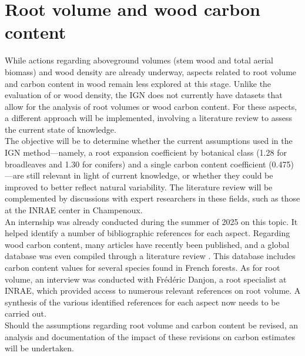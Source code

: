 \chapter{Root volume and wood carbon content \label{chap::cc}}

While actions regarding aboveground volumes (stem wood and total aerial biomass) and wood density are already underway, aspects related to root volume and carbon content in wood remain less explored at this stage. Unlike the evaluation of or wood density, the IGN does not currently have datasets that allow for the analysis of root volumes or wood carbon content. For these aspects, a different approach will be implemented, involving a literature review to assess the current state of knowledge. \\

The objective will be to determine whether the current assumptions used in the IGN method---namely, a root expansion coefficient by botanical class (1.28 for broadleaves and 1.30 for conifers) and a single carbon content coefficient (0.475)---are still relevant in light of current knowledge, or whether they could be improved to better reflect natural variability. The literature review will be complemented by discussions with expert researchers in these fields, such as those at the INRAE center in Champenoux. \\

An internship was already conducted during the summer of 2025 on this topic. It helped identify a number of bibliographic references for each aspect. Regarding wood carbon content, many articles have recently been published, and a global database was even compiled through a literature review \parencite{Doraisami2022}. This database includes carbon content values for several species found in French forests. As for root volume, an interview was conducted with Frédéric Danjon, a root specialist at INRAE, which provided access to numerous relevant references on root volume. A synthesis of the various identified references for each aspect now needs to be carried out. \\

Should the assumptions regarding root volume and carbon content be revised, an analysis and documentation of the impact of these revisions on carbon estimates will be undertaken.